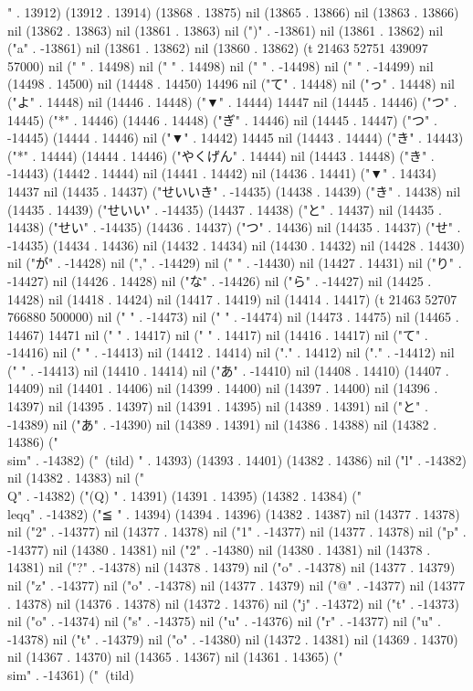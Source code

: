 " . 13912) (13912 . 13914) (13868 . 13875) nil (13865 . 13866) nil (13863 . 13866) nil (13862 . 13863) nil (13861 . 13863) nil (")" . -13861) nil (13861 . 13862) nil ("a" . -13861) nil (13861 . 13862) nil (13860 . 13862) (t 21463 52751 439097 57000) nil (" " . 14498) nil ("
" . 14498) nil ("
" . -14498) nil (" " . -14499) nil (14498 . 14500) nil (14448 . 14450) 14496 nil ("て" . 14448) nil ("っ" . 14448) nil ("よ" . 14448) nil (14446 . 14448) ("▼" . 14444) 14447 nil (14445 . 14446) ("つ" . 14445) ("*" . 14446) (14446 . 14448) ("ぎ" . 14446) nil (14445 . 14447) ("つ" . -14445) (14444 . 14446) nil ("▼" . 14442) 14445 nil (14443 . 14444) ("き" . 14443) ("*" . 14444) (14444 . 14446) ("やくげん" . 14444) nil (14443 . 14448) ("き" . -14443) (14442 . 14444) nil (14441 . 14442) nil (14436 . 14441) ("▼" . 14434) 14437 nil (14435 . 14437) ("せいいき" . -14435) (14438 . 14439) ("き" . 14438) nil (14435 . 14439) ("せいい" . -14435) (14437 . 14438) ("と" . 14437) nil (14435 . 14438) ("せい" . -14435) (14436 . 14437) ("つ" . 14436) nil (14435 . 14437) ("せ" . -14435) (14434 . 14436) nil (14432 . 14434) nil (14430 . 14432) nil (14428 . 14430) nil ("が" . -14428) nil ("," . -14429) nil (" " . -14430) nil (14427 . 14431) nil ("り" . -14427) nil (14426 . 14428) nil ("な" . -14426) nil ("ら" . -14427) nil (14425 . 14428) nil (14418 . 14424) nil (14417 . 14419) nil (14414 . 14417) (t 21463 52707 766880 500000) nil ("
" . -14473) nil (" " . -14474) nil (14473 . 14475) nil (14465 . 14467) 14471 nil (" " . 14417) nil ("
" . 14417) nil (14416 . 14417) nil ("て" . -14416) nil (" " . -14413) nil (14412 . 14414) nil ("." . 14412) nil ("." . -14412) nil (" " . -14413) nil (14410 . 14414) nil ("あ" . -14410) nil (14408 . 14410) (14407 . 14409) nil (14401 . 14406) nil (14399 . 14400) nil (14397 . 14400) nil (14396 . 14397) nil (14395 . 14397) nil (14391 . 14395) nil (14389 . 14391) nil ("と" . -14389) nil ("あ" . -14390) nil (14389 . 14391) nil (14386 . 14388) nil (14382 . 14386) ("\\sim" . -14382) ("~(tild)
" . 14393) (14393 . 14401) (14382 . 14386) nil ("l" . -14382) nil (14382 . 14383) nil ("\\Q" . -14382) ("(Q)
" . 14391) (14391 . 14395) (14382 . 14384) ("\\leqq" . -14382) ("≦
" . 14394) (14394 . 14396) (14382 . 14387) nil (14377 . 14378) nil ("2" . -14377) nil (14377 . 14378) nil ("1" . -14377) nil (14377 . 14378) nil ("p" . -14377) nil (14380 . 14381) nil ("2" . -14380) nil (14380 . 14381) nil (14378 . 14381) nil ("?" . -14378) nil (14378 . 14379) nil ("o" . -14378) nil (14377 . 14379) nil ("z" . -14377) nil ("o" . -14378) nil (14377 . 14379) nil ("@" . -14377) nil (14377 . 14378) nil (14376 . 14378) nil (14372 . 14376) nil ("j" . -14372) nil ("t" . -14373) nil ("o" . -14374) nil ("s" . -14375) nil ("u" . -14376) nil ("r" . -14377) nil ("u" . -14378) nil ("t" . -14379) nil ("o" . -14380) nil (14372 . 14381) nil (14369 . 14370) nil (14367 . 14370) nil (14365 . 14367) nil (14361 . 14365) ("\\sim" . -14361) ("~(tild)
